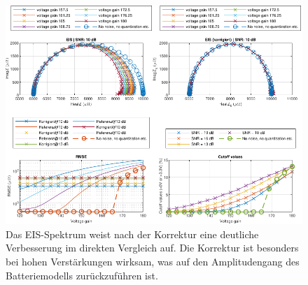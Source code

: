 \begin{figure}[hbt!]
	\centering
	\includegraphics[width=.99\textwidth]{../img/ergebnisse.pdf}
	\caption{Das EIS-Spektrum weist nach der Korrektur eine deutliche Verbesserung im direkten Vergleich auf. Die Korrektur ist besonders bei hohen Verstärkungen wirksam, was auf den Amplitudengang des Batteriemodells zurückzuführen ist.}
	\label{fig:Ergebnisse} 
\end{figure}

\newpage
   

